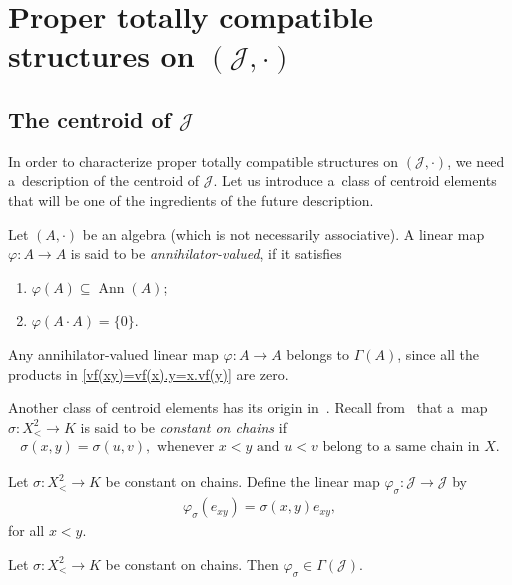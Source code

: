 \documentclass{jonasart}
\newcommand{\G}{\Gamma}
\newcommand{\J}{\mathcal{J}}
\newcommand{\sg}{\sigma}
\newcommand{\sst}{\subseteq}
\newcommand{\vf}{\varphi}
\DeclareMathOperator{\Ann}{Ann}
\begin{document}
	\section{Proper totally compatible structures on $(\J,\cdot)$}\label{sec-prop-tot-comp}

	\subsection{The centroid of $\J$}

	In order to characterize proper totally compatible structures on $(\J,\cdot)$, we need a~description of the centroid of $\J$. Let us introduce a~class of centroid elements that will be one of the ingredients of the future description.
	\begin{definition}
		Let $(A,\cdot)$ be an algebra (which is not necessarily associative). A linear map $\vf:A\to A$ is said to be \textit{annihilator-valued}, if it satisfies
		\begin{enumerate}
			\item $\vf(A)\sst \Ann(A)$;
			\item $\vf(A\cdot A)=\{0\}$.
		\end{enumerate}
	\end{definition}

	\begin{remark}\label{ann-val-centroid}
		Any annihilator-valued linear map $\vf:A\to A$ belongs to $\G(A)$, since all the products in \eqref{vf(xy)=vf(x).y=x.vf(y)} are zero.
	\end{remark}

	Another class of centroid elements has its origin in~\cite{KK8}. Recall from~\cite{KK8} that a~map $\sg:X^2_<\to K$ is said to be \textit{constant on chains} if
	\begin{align*}
		\sg(x,y)=\sg(u,v),\text{ whenever }x<y\text{ and }u<v\text{ belong to a~same chain in }X.
	\end{align*}

	\begin{definition}
		Let $\sg:X^2_<\to K$ be constant on chains. Define the linear map $\vf_\sg:\J\to \J$ by
		\begin{align*}
			\vf_\sg(e_{xy})=\sg(x,y)e_{xy},
		\end{align*}
		for all $x<y$.
	\end{definition}

	\begin{lemma}\label{vf_s g-in-G(J)}
		Let $\sg:X^2_<\to K$ be constant on chains. Then $\vf_\sg\in\G(\J)$.
	\end{lemma}
\end{document}
